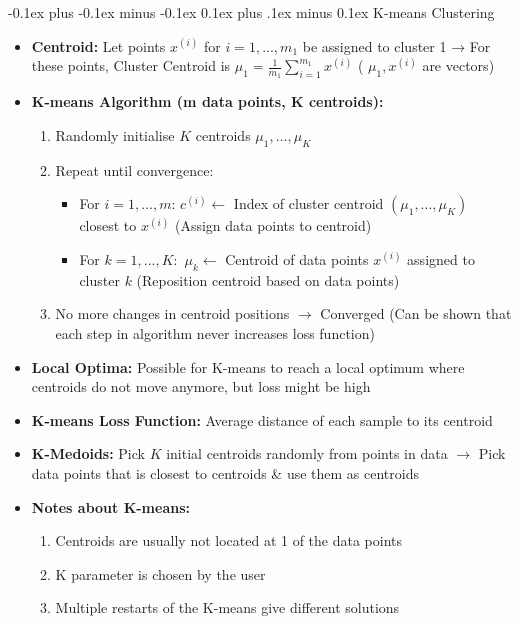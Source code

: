 \documentclass[landscape]{article}
\makeatletter
\renewcommand{\subsection}{\@startsection{subsection}{2}{0mm}%
  {-0.1ex plus -0.1ex minus -0.1ex}%
  {0.1ex plus .1ex minus 0.1ex}%
{\normalfont\scriptsize\bfseries}}
\makeatother
\begin{document}
\begin{multicols*}{5}
        \subsection{K-means Clustering}
        \begin{itemize}
          \item \textbf{Centroid:} Let points $x^{(i)}$ for $i=1,...,m_1$ be assigned to cluster 1 → For these points, Cluster Centroid is $\mu_1 = \frac{1}{m_1}\sum_{i=1}^{m_1}x^{(i)}$ ( $\mu_1, x^{(i)}$ are vectors)
          \item \textbf{K-means Algorithm (m data points, K centroids):}
          \begin{enumerate}
            \item Randomly initialise $K$ centroids $\mu_1,...,\mu_K$
            \item Repeat until convergence:
            \begin{itemize}
              \item For $i=1,...,m$: $c^{(i)} \leftarrow$ Index of cluster centroid $(\mu_1,...,\mu_K)$ closest to $x^{(i)}$ (Assign data points to centroid)
              \item For $k=1,...,K:$ $\mu_k \leftarrow$ Centroid of data points $x^{(i)}$ assigned to cluster $k$ (Reposition centroid based on data points)
            \end{itemize}
            \item No more changes in centroid positions $\rightarrow$ Converged (Can be shown that each step in algorithm never increases loss function)
          \end{enumerate}
          \item \textbf{Local Optima:} Possible for K-means to reach a local optimum where centroids do not move anymore, but loss might be high
          \item \textbf{K-means Loss Function:} Average distance of each sample to its centroid
          \item \textbf{K-Medoids:} Pick $K$ initial centroids randomly from points in data $\rightarrow$ Pick data points that is closest to centroids \& use them as centroids
          \item \textbf{Notes about K-means:}
          \begin{enumerate}
            \item Centroids are usually not located at 1 of the data points
            \item K parameter is chosen by the user
            \item Multiple restarts of the K-means give different solutions
          \end{enumerate}
        \end{itemize}


\end{multicols*}
\end{document}
